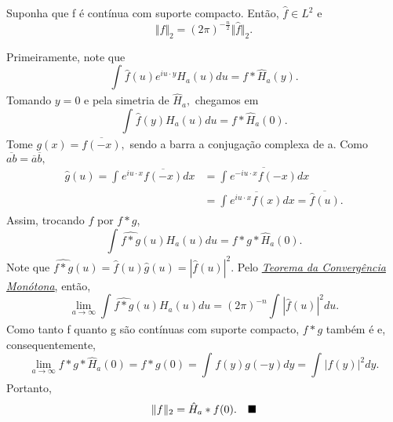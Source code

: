 \documentclass[MeasureTheory/measure_theory.tex]{subfiles}
\begin{document}
\hypertarget{plancherel}{
	\begin{theorem*}
		Suponha que f é contínua com suporte compacto. Então, \(\hat{f}\in L^{2}\) e
		\[
			\Vert f \Vert_{2} = (2\pi )^{-\frac{n}{2}}\Vert \hat{f} \Vert_{2}.
		\]
	\end{theorem*}
}
\begin{proof*}
	Primeiramente, note que
	\[
		\int_{}^{}\hat{f}(u)e^{iu \cdot y}H_{a}(u)du = f*\hat{H}_{a}(y).
	\]
	Tomando \(y=0\) e pela simetria de \(\hat{H}_{a},\) chegamos em
	\[
		\int_{}^{}\hat{f}(y)H_{a}(u)du = f* \hat{H}_{a}(0).
	\]
	Tome \(g(x) = \overline{f(-x)},\) sendo a barra a conjugação complexa de a. Como \(\overline{ab} = \overline{a}\overline{b},\)
	\begin{align*}
		\hat{g}(u) = \int_{}^{}e^{iu \cdot x}\overline{f(-x)}dx & = \overline{\int_{}^{}e^{-i u \cdot x}f(-x)dx}                       \\
		                                                        & = \overline{\int_{}^{}e^{iu \cdot x}f(x)dx} = \overline{\hat{f}(u)}.
	\end{align*}
	Assim, trocando \(f\) por \(f*g\),
	\[
		\int_{}^{}\widehat{f*g}(u)H_{a}(u)du = f*g*\hat{H}_{a}(0).
	\]
	Note que \(\widehat{f*g}(u) = \hat{f}(u)\hat{g}(u) = |\hat{f}(u)|^{2}\). Pelo \hyperlink{monotone_convergence}{\textit{Teorema da Convergência Monótona},} então,
	\[
		\lim_{a\to \infty}\int_{}^{}\widehat{f*g}(u)H_{a}(u)du = (2\pi )^{-n}\int_{}^{}|\hat{f}(u)|^{2}du.
	\]
	Como tanto f quanto g são contínuas com suporte compacto, \(f*g\) também é e, consequentemente,
	\[
		\lim_{a\to \infty}f*g*\hat{H}_{a}(0) = f*g(0) = \int_{}^{}f(y)g(-y)dy = \int_{}^{}|f(y)|^{2}dy.
	\]
	Portanto,
	\[
		\Vert f \Vert_{2} = \hat{H}_{a}*f(0).\quad \text{$\blacksquare$}
	\]
\end{proof*}
\end{document}
